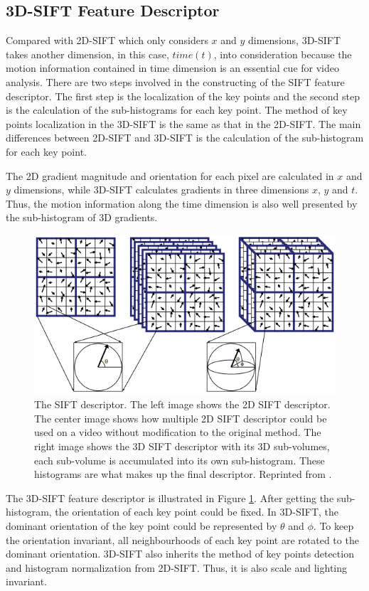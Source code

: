\subsection{3D-SIFT Feature Descriptor}
\label{2_2_1}
Compared with 2D-SIFT \cite{lowe1999} \cite{lowe2004} which only considers \(x\) and \(y\) dimensions, 3D-SIFT \cite{grepory2010} \cite{paul2007} takes another dimension, in this case, \(time(t)\), into consideration because the motion information contained in time dimension is an essential cue for video analysis. There are two steps involved in the constructing of the SIFT feature descriptor. The first step is the localization of the key points and the second step is the calculation of the sub-histograms for each key point. The method of key points localization in the 3D-SIFT is the same as that in the 2D-SIFT. The main differences between 2D-SIFT and 3D-SIFT is the calculation of the sub-histogram for each key point.
\par 
The 2D gradient magnitude and orientation for each pixel are calculated in \(x\) and \(y\) dimensions, while 3D-SIFT calculates gradients in three dimensions \(x\), \(y\) and \(t\). Thus, the motion information along the time dimension is also well presented by the sub-histogram of 3D gradients.
  
\begin{figure}
	\includegraphics[width=\linewidth]{figs/3D_SIFT.png}
	\caption{The SIFT descriptor. The left image shows the 2D SIFT descriptor. The center image shows how multiple 2D SIFT descriptor could be used on a video without modification to the original method. The right image shows the 3D SIFT descriptor with its 3D sub-volumes, each sub-volume is accumulated into its own sub-histogram. These histograms are what makes up the final descriptor. Reprinted from \cite{grepory2010}.}
	\label{fig:3DSIFT}
\end{figure}
\par 
The 3D-SIFT feature descriptor is illustrated in Figure \ref{fig:3DSIFT}. After getting the sub-histogram, the orientation of each key point could be fixed. In 3D-SIFT, the dominant orientation of the key point could be represented by\(\) \(\theta\) and \(\phi\). To keep the orientation invariant, all neighbourhoods of each key point are rotated to the dominant orientation. 3D-SIFT also inherits the method of key points detection and histogram normalization from 2D-SIFT. Thus, it is also scale and lighting invariant. 


